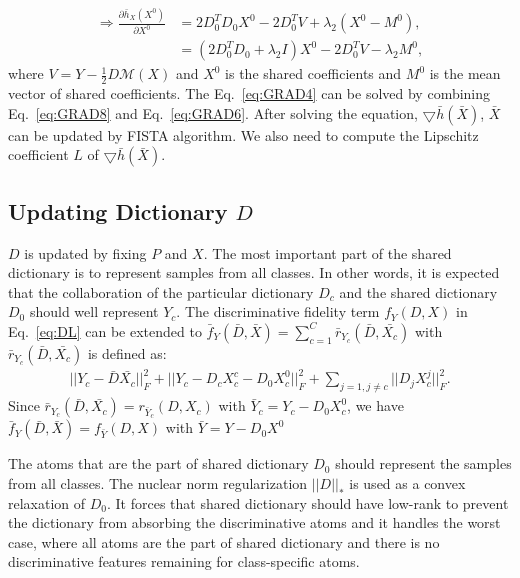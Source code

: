 \begin{equation}
\begin{aligned}
\Rightarrow \frac{\partial \bar{h}_{X}(X^0)}{\partial X^0} & = 2D_0^TD_0X^0 - 2D_0^TV +\lambda_2(X^0 - M^0),\\
& = (2D_0^TD_0+\lambda_2I)X^0 - 2D_0^TV - \lambda_2M^0,
\end{aligned}
\label{eq:GRAD8}
\end{equation}
where $V = Y-\frac{1}{2}D\mathcal{M}(X)$ and $X^0$ is the shared coefficients and $M^0$ is the mean vector of shared coefficients. The Eq.~\eqref{eq:GRAD4} can be solved by combining Eq.~\eqref{eq:GRAD8} and Eq.~\eqref{eq:GRAD6}.
After solving the equation, $\bigtriangledown \bar{h}(\bar{X})$, $\bar{X}$ can be updated by FISTA algorithm. We also need to compute the Lipschitz coefficient $L$ of $\bigtriangledown \bar{h}(\bar{X})$.


\subsection*{Updating Dictionary $D$}

$D$ is updated by fixing $P$ and $X$. 
The most important part of the shared dictionary is to represent samples from all classes. In other words,
it is expected that the collaboration of the particular dictionary $D_c$ and the shared dictionary $D_0$ should well represent $Y_c$. 
 The discriminative fidelity term $f_Y(D,X)$ in Eq.~\eqref{eq:DL} can be extended to $\bar{f}_Y(\bar{D},\bar{X}) = \sum_{c=1}^{C}\bar{r}_{Y_c}(\bar{D},\bar{X_c})$ with $\bar{r}_{Y_c}(\bar{D},\bar{X_c})$ is defined as:
\begin{equation}
\begin{aligned}
||Y_c-\bar{D}\bar{X_{c}}||_F^2 + ||Y_c-D_c X_c^c-D_0X_c^0||_F^2 + \sum_{j=1,j\neq c} ||D_jX_c^j||_F^2.
\end{aligned}
\label{eq:DL0}
\end{equation}
Since $\bar{r}_{Y_c}(\bar{D},\bar{X_c}) = r_{\bar{Y}_c}(D,X_c)$ with $\bar{Y}_c = Y_c-D_0X_c^0$, we have $\bar{f}_Y(\bar{D},\bar{X}) = f_{\bar{Y}}(D,X)$ with $\bar{Y}=Y-D_0X^0$

The atoms that are the part of shared dictionary $D_0$ should represent the samples from all classes. The nuclear norm regularization $||D||_*$ is used as a convex relaxation of $D_0$. It forces that shared dictionary should have low-rank to prevent the dictionary from absorbing the discriminative atoms and it handles the worst case, where all atoms are the part of shared dictionary and there is no discriminative features remaining for class-specific atoms.

